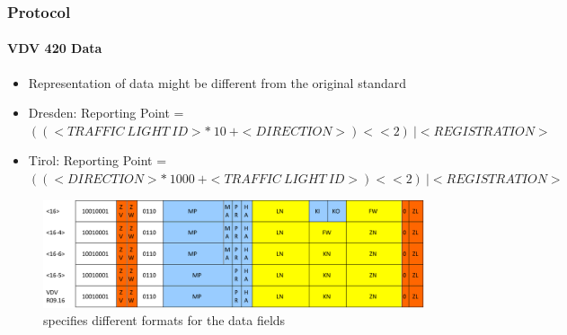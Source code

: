 
\begin{frame}
\frametitle{Protocol}
\framesubtitle{VDV 420 Data}
\begin{itemize}
	\item Representation of data might be different from the original standard
	\item Dresden: Reporting Point = $((<TRAFFIC\ LIGHT\ ID> *\ 10\ + <DIRECTION>) << 2)\ | <REGISTRATION>$
	\item Tirol: Reporting Point = $((<DIRECTION> *\ 1000\ + <TRAFFIC\ LIGHT\ ID>) << 2)\ | <REGISTRATION>$ 
\end{itemize}
\begin{figure}
\centering
\includegraphics[width=.9\textwidth]{figs/vdv426-r09-variants.pdf}
\caption{ specifies different formats for the data fields}
\end{figure}
\end{frame}


